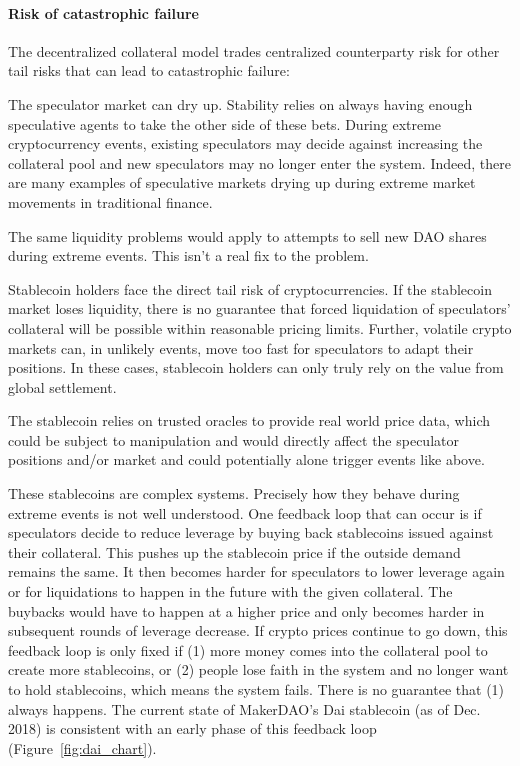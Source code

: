 \documentclass[10pt]{article}
\begin{document}
\paragraph{Risk of catastrophic failure} The decentralized collateral model trades centralized counterparty risk for other tail risks that can lead to catastrophic failure:
\begin{compactenum}
	\item The speculator market can dry up. Stability relies on always having enough speculative agents to take the other side of these bets. During extreme cryptocurrency events, existing speculators may decide against increasing the collateral pool and new speculators may no longer enter the system. Indeed, there are many examples of speculative markets drying up during extreme market movements in traditional finance.
	
	\item The same liquidity problems would apply to attempts to sell new DAO shares during extreme events. This isn't a real fix to the problem.
	
	\item Stablecoin holders face the direct tail risk of cryptocurrencies. If the stablecoin market loses liquidity, there is no guarantee that forced liquidation of speculators' collateral will be possible within reasonable pricing limits. Further, volatile crypto markets can, in unlikely events, move too fast for speculators to adapt their positions. In these cases, stablecoin holders can only truly rely on the value from global settlement.
	
	\item The stablecoin relies on trusted oracles to provide real world price data, which could be subject to manipulation and would directly affect the speculator positions and/or market and could potentially alone trigger events like above.
\end{compactenum}

These stablecoins are complex systems. Precisely how they behave during extreme events is not well understood. One feedback loop that can occur is if speculators decide to reduce leverage by buying back stablecoins issued against their collateral. This pushes up the stablecoin price if the outside demand remains the same. It then becomes harder for speculators to lower leverage again or for liquidations to happen in the future with the given collateral. The buybacks would have to happen at a higher price and only becomes harder in subsequent rounds of leverage decrease. If crypto prices continue to go down, this feedback loop is only fixed if (1) more money comes into the collateral pool to create more stablecoins, or (2) people lose faith in the system and no longer want to hold stablecoins, which means the system fails. There is no guarantee that (1) always happens. The current state of MakerDAO's Dai stablecoin (as of Dec. 2018) is consistent with an early phase of this feedback loop (Figure~\ref{fig:dai_chart}).
\end{document}
